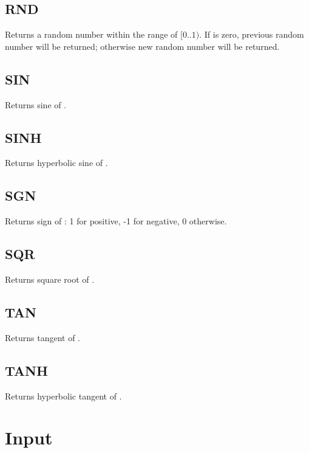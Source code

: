     \subsection{RND}
        \par
        Returns a random number within the range of $[0..1)$. If  is zero, previous random number will be returned; otherwise new random number will be returned.
    \subsection{SIN}
        \par
        Returns sine of .
    \subsection{SINH}
        \par
        Returns hyperbolic sine of .
    \subsection{SGN}
        \par
        Returns sign of : 1 for positive, -1 for negative, 0 otherwise.
    \subsection{SQR}
        \par
        Returns square root of .
    \subsection{TAN}
        \par
        Returns tangent of .
    \subsection{TANH}
        \par
        Returns hyperbolic tangent of .

\section{Input}

